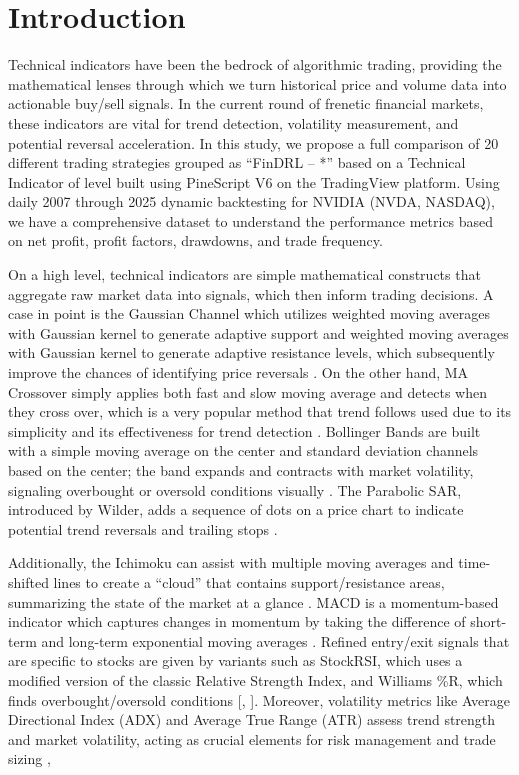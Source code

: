 \section{Introduction}
Technical indicators have been the bedrock of algorithmic trading, providing the mathematical lenses through which we turn historical price and volume data into actionable buy/sell signals. In the current round of frenetic financial markets, these indicators are vital for trend detection, volatility measurement, and potential reversal acceleration. In this study, we propose a full comparison of 20 different trading strategies grouped as “FinDRL – *” based on a Technical Indicator of level built using PineScript V6 on the TradingView platform. Using daily 2007 through 2025 dynamic backtesting for NVIDIA (NVDA, NASDAQ), we have a comprehensive dataset to understand the performance metrics based on net profit, profit factors, drawdowns, and trade frequency.

On a high level, technical indicators are simple mathematical constructs that aggregate raw market data into signals, which then inform trading decisions. A case in point is the Gaussian Channel which utilizes weighted moving averages with Gaussian kernel to generate adaptive support and weighted moving averages with Gaussian kernel to generate adaptive resistance levels, which subsequently improve the chances of identifying price reversals \cite{gaussian_channel_2022}. On the other hand, MA Crossover simply applies both fast and slow moving average and detects when they cross over, which is a very popular method that trend follows used due to its simplicity and its effectiveness for trend detection \cite{macrossover_trend_2015}. Bollinger Bands are built with a simple moving average on the center and standard deviation channels based on the center; the band expands and contracts with market volatility, signaling overbought or oversold conditions visually \cite{bollinger_bands_1991}. The Parabolic SAR, introduced by Wilder, adds a sequence of dots on a price chart to indicate potential trend reversals and trailing stops \cite{wilder_indicators_1978}.

Additionally, the Ichimoku can assist with multiple moving averages and time-shifted lines to create a “cloud” that contains support/resistance areas, summarizing the state of the market at a glance \cite{ichimoku_cloud_2010}. MACD is a momentum-based indicator which captures changes in momentum by taking the difference of short-term and long-term exponential moving averages \cite{macd_momentum_1986}. Refined entry/exit signals that are specific to stocks are given by variants such as StockRSI, which uses a modified version of the classic Relative Strength Index, and Williams \%R, which finds overbought/oversold conditions [\cite{stockrsi_refined_2018}, \cite{williams_r_1980}]. Moreover, volatility metrics like Average Directional Index (ADX) and Average True Range (ATR) assess trend strength and market volatility, acting as crucial elements for risk management and trade sizing \cite{wilder_indicators_1978},

